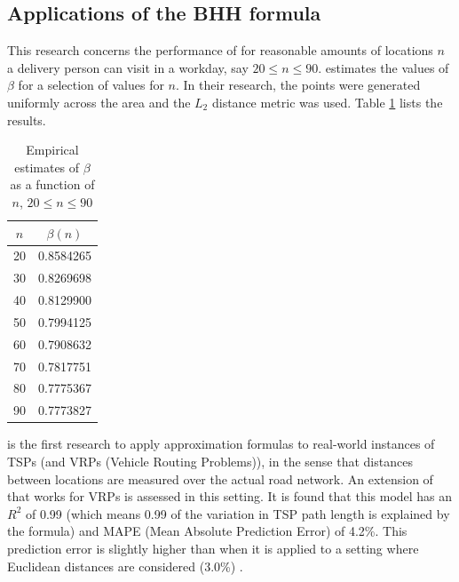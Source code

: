 \subsection{Applications of the BHH formula}
This research concerns the performance of  for reasonable amounts of locations $n$ a delivery person can visit in a workday, say $20\leq n\leq90$.
\citet{lei2015dynamic} estimates the values of $\beta$ for a selection of values for $n$.
In their research, the points were generated uniformly across the area and the $L_2$ distance metric was used.
Table \ref{tab:beta-values} lists the results.
\begin{table}[H]
	\centering
	\caption{Empirical estimates of $\beta$ as a function of $n$, $20 \leq n \leq 90$ \citep{lei2015dynamic}}
	\label{tab:beta-values}
	\begin{tabular}{cc}
		\toprule
		$n$ & $\beta(n)$ \\
		\midrule
		20  & 0.8584265  \\
		30  & 0.8269698  \\
		40  & 0.8129900  \\
		50  & 0.7994125  \\
		60  & 0.7908632  \\
		70  & 0.7817751  \\
		80  & 0.7775367  \\
		90  & 0.7773827  \\
		\bottomrule
	\end{tabular}
\end{table}
\citet{figliozzi2008planning} is the first research to apply approximation formulas to real-world instances of TSPs (and VRPs (Vehicle Routing Problems)), in the sense that distances between locations are measured over the actual road network.
An extension of  that works for VRPs is assessed in this setting.
It is found that this model has an $R^2$ of 0.99 (which means 0.99 of the variation in TSP path length is explained by the formula) and MAPE (Mean Absolute Prediction Error) of 4.2\%.
This prediction error is slightly higher than when it is applied to a setting where Euclidean distances are considered (3.0\%) \citep{figliozzi2008planning}.

